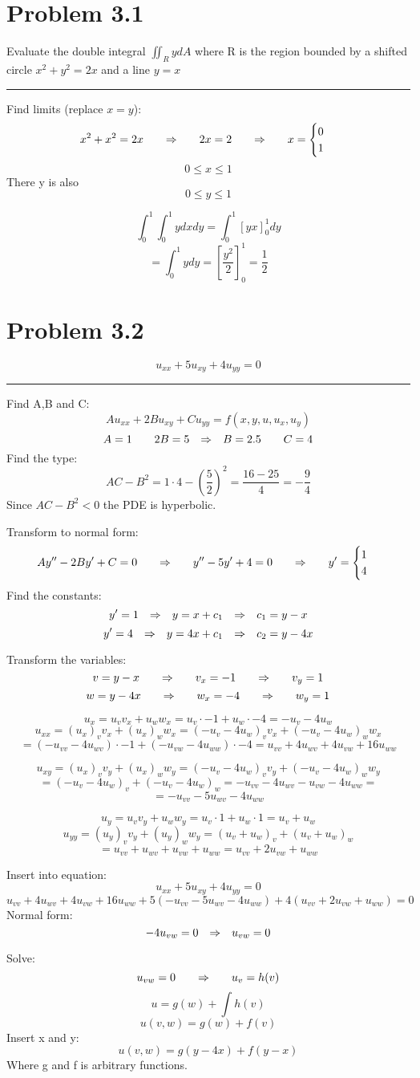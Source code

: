 \section*{Problem 3.1}
Evaluate the double integral $\iint_R y dA$ where R is the region bounded by a shifted circle $x^2+y^2=2x$ and a line $y=x$

\rule{\textwidth}{0.5pt}

Find limits (replace $x=y$):
$$x^2+x^2=2x{\qquad\Rightarrow\qquad} 2x=2{\qquad\Rightarrow\qquad} x=\begin{cases}
   0\\
   1
\end{cases}$$
$$0\leq x\leq 1$$
There y is also
$$0\leq y\leq 1$$

$$\int_0^1\int_0^1 y dxdy=\int_0^1\left[ yx \right]_0^1dy$$
$$=\int_0^1ydy=\left[ \frac{y^2}{2} \right]_0^1=\frac{1}{2}$$

\section*{Problem 3.2}
$$u_{xx}+5u_{xy}+4u_{yy}=0$$

\rule{\textwidth}{0.5pt}
Find A,B and C:
$$Au_{xx}+2Bu_{xy}+Cu_{yy}=f(x,y,u,u_x,u_y)$$
$$A=1\qquad 2B=5{\quad\Rightarrow\quad} B=2.5\qquad C=4$$
Find the type:
$$AC-B^2=1\cdot 4-\left(\frac{5}{2}\right)^2=\frac{16-25}{4}=-\frac{9}{4}$$
Since $AC-B^2<0$ the PDE is hyperbolic.

Transform to normal form:
$$Ay''-2By'+C=0{\qquad\Rightarrow\qquad} y''-5y'+4=0{\qquad\Rightarrow\qquad} y'=\begin{cases}
   1\\
   4
\end{cases}$$
Find the constants:
$$y'=1 {\quad\Rightarrow\quad} y=x+c_1 {\quad\Rightarrow\quad} c_1=y-x$$
$$y'=4 {\quad\Rightarrow\quad} y=4x+c_1 {\quad\Rightarrow\quad} c_2=y-4x$$

Transform the variables:
$$v=y-x {\qquad\Rightarrow\qquad} v_x=-1 {\qquad\Rightarrow\qquad}  v_y=1$$
$$w=y-4x {\qquad\Rightarrow\qquad} w_x=-4 {\qquad\Rightarrow\qquad}  w_y=1$$

$$u_x=u_v v_x +u_w w_x=u_v\cdot -1+u_w\cdot -4=-u_v-4u_w$$
$$u_{xx}=(u_x)_v v_x + (u_x)_w w_x=(-u_v-4u_w)_v v_x + (-u_v-4u_w)_w w_x$$
$$=(-u_{vv}-4u_{wv})\cdot -1+(-u_{vw}-4u_{ww})\cdot -4=\boxed{u_{vv}+4u_{wv}+4u_{vw}+16u_{ww}}$$

$$u_{xy}=(u_x)_v v_y + (u_x)_w w_y=(-u_v-4u_w)_v v_y + (-u_v-4u_w)_w w_y$$
$$=(-u_v-4u_w)_v + (-u_v-4u_w)_w=-u_{vv}-4u_{wv} -u_{vw}-4u_{ww}=$$
$$=\boxed{-u_{vv}-5u_{wv}-4u_{ww}}$$

$$u_y=u_v v_y +u_w w_y=u_v\cdot 1+u_w\cdot 1=\boxed{u_v+u_w}$$
$$u_{yy}=(u_y)_v v_y + (u_y)_w w_y=(u_v+u_w)_v + (u_v+u_w)_w$$
$$=u_{vv}+u_{wv} + u_{vw}+u_{ww}=\boxed{u_{vv}+2u_{vw}+u_{ww}}$$

Insert into equation:
$$u_{xx}+5u_{xy}+4u_{yy}=0$$
$$u_{vv}+4u_{wv}+4u_{vw}+16u_{ww}+5(-u_{vv}-5u_{wv}-4u_{ww})+4(u_{vv}+2u_{vw}+u_{ww})=0$$
Normal form:
$$-4u_{vw}=0{\quad\Rightarrow\quad} u_{vw}=0$$

Solve:
$$u_{vw}=0{\qquad\Rightarrow\qquad} u_v=h(v)$$
$$u=g(w)+\int h(v)$$
$$u(v,w)=g(w)+f(v)$$
Insert x and y:
$$u(v,w)=g(y-4x)+f(y-x)$$
Where g and f is arbitrary functions.
